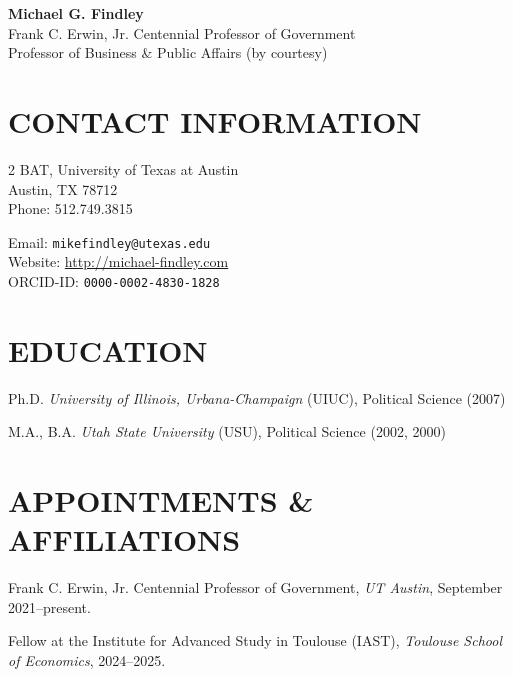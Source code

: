 \documentclass[10pt]{article}
\begin{document}
 
\begin{center}
\LARGE{\textbf{Michael G. Findley}} \\ Frank C. Erwin, Jr. Centennial Professor of Government 
\\ Professor of Business \& Public Affairs (by courtesy)

\end{center}

\section*{CONTACT INFORMATION}

\begin{multicols}{2}
 BAT, University of Texas at Austin  \\ 
Austin, TX 78712 \\ Phone: 512.749.3815
\begin{flushright} Email:
\texttt{mikefindley@utexas.edu}
\\ Website: \href{http://michael-findley.com}{http://michael-findley.com} \\ ORCID-ID: \texttt{0000-0002-4830-1828}
\end{flushright}
\end{multicols}


\section*{EDUCATION}
\noindent Ph.D. \textit{University of Illinois, Urbana-Champaign} (UIUC), Political Science (2007)

\noindent M.A., B.A. \textit{Utah State University} (USU), Political Science (2002, 2000)

\section*{APPOINTMENTS \& AFFILIATIONS}

\noindent  Frank C. Erwin, Jr. Centennial Professor of Government, \textit{UT Austin}, September 2021--present.

\noindent  Fellow at the Institute for Advanced Study in Toulouse (IAST), \textit{Toulouse School of Economics}, 2024--2025. %
\end{document}
